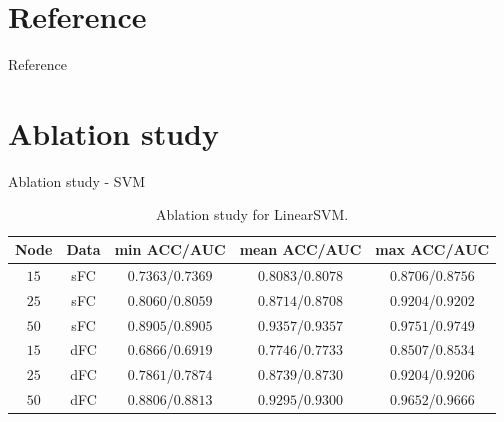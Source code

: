 \documentclass{beamer}
\begin{document}
\section*{Reference}
\begin{frame}[allowframebreaks]{Reference}
    \printbibliography
\end{frame}

\appendix

\section{Ablation study}

\begin{frame}{Ablation study - SVM}
    \begin{table}[H]
        \centering
        \begin{tabular}{|c|c|c|c|c|}
            \hline
            Node & Data & min ACC/AUC       & mean ACC/AUC      & max ACC/AUC       \\
            \hline
            $15$ & sFC  & $0.7363$/$0.7369$ & $0.8083$/$0.8078$ & $0.8706$/$0.8756$ \\
            \hline
            $25$ & sFC  & $0.8060$/$0.8059$ & $0.8714$/$0.8708$ & $0.9204$/$0.9202$ \\
            \hline
            $50$ & sFC  & $0.8905$/$0.8905$ & $0.9357$/$0.9357$ & $0.9751$/$0.9749$ \\
            \hline
            $15$ & dFC  & $0.6866$/$0.6919$ & $0.7746$/$0.7733$ & $0.8507$/$0.8534$ \\
            \hline
            $25$ & dFC  & $0.7861$/$0.7874$ & $0.8739$/$0.8730$ & $0.9204$/$0.9206$ \\
            \hline
            $50$ & dFC  & $0.8806$/$0.8813$ & $0.9295$/$0.9300$ & $0.9652$/$0.9666$ \\
            \hline
        \end{tabular}
        \caption{Ablation study for LinearSVM.}
    \end{table}
\end{frame}
\end{document}
